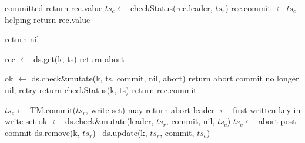 \begin{algorithm}[t]
  \begin{algorithmic}
    \small
		 \Comment committed
     			   \State return rec.value \EndIf
 			\State $ts_c \leftarrow$ {\sc checkStatus}(rec.leader, $ts_r$)
   			\State rec.commit $\leftarrow ts_c$ \Comment helping 
 			   \State return  rec.value \EndIf
      		\EndIf
      		


      \EndFor
      \State  return nil
      \EndProcedure

\Statex


      				\State rec $\leftarrow$ ds.get(k, ts) 
     				 	 return abort  
     				 \EndIf 		
     				 
     				    
     				 	\State ok $\leftarrow$ ds.check\&mutate(k, ts, commit, nil, abort)
						\State return abort	
					\Else \Comment commit  no longer nil, retry
						\State return {\sc checkStatus}(k, ts)
	     				 \EndIf 			
				\EndIf
				\State return rec.commit  %
	   	\EndProcedure
\Statex

      	\State $ts_c \leftarrow$ TM.commit($ts_r$, write-set) \Comment may return abort
		\State leader  $\leftarrow$ first written key in write-set %
	      	 \State  ok $\leftarrow$ ds.check\&mutate(leader, $ts_r$, commit, nil,  $ts_c$)
   		 $ts_c \leftarrow$ abort \EndIf
	\EndIf
	\State \Comment post-commit
			 ds.remove(k, $ts_r$)  	
			\Else\ ds.update(k, $ts_r$, commit, $ts_c$)
			\EndIf
	\EndFor
\EndProcedure
      

\end{algorithmic}
\end{algorithm}
